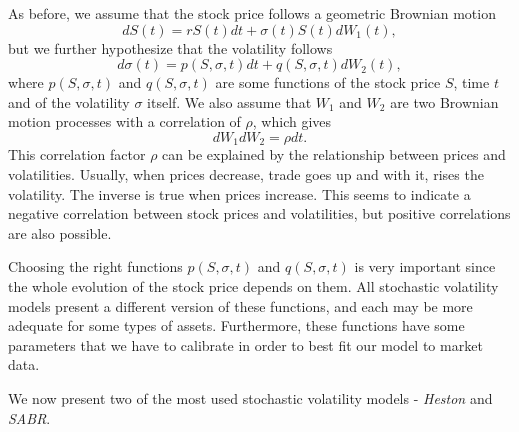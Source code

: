 As before, we assume that the stock price follows a geometric Brownian motion
\begin{equation}\label{stochvol}
dS(t)=rS(t)dt+\sigma(t)S(t)dW_1(t),
\end{equation}
\noindent but we further hypothesize that the volatility follows
\begin{equation}
d\sigma(t)=p(S,\sigma,t)dt+q(S,\sigma,t)dW_2(t),
\end{equation}
\noindent where $p(S,\sigma,t)$ and $q(S,\sigma,t)$ are some functions of the stock price $S$, time $t$ and of the volatility $\sigma$ itself. We also assume that $W_1$ and $W_2$ are two Brownian motion processes with a correlation of $\rho$, which gives
\begin{equation}
dW_1dW_2=\rho dt.
\end{equation}
\noindent This correlation factor $\rho$ can be explained by the relationship between prices and volatilities. Usually, when prices decrease, trade goes up and with it, rises the volatility. The inverse is true when prices increase. This seems to indicate a negative correlation between stock prices and volatilities, but positive correlations are also possible.

\iffalse
\hl{This correlation can be explained by the relationship between prices and volatilities.} As an example, we can consider a stock that costs \textdollar100 and changes by \textdollar0.10 daily. We can estimate, even without calculations, that it is very stable and thus has a low volatility.
On the other hand if another stock costs \textdollar1 and changes by \textdollar0.10 in a day, we can see that it is extremely volatile even though it changed by the same amount as the first. With this example, we can see that the volatility has some correlation with the stock price.
\fi

Choosing the right functions $p(S,\sigma,t)$ and $q(S,\sigma,t)$ is very important since the whole evolution of the stock price depends on them. All stochastic volatility models present a different version of these functions, and each may be more adequate for some types of assets. Furthermore, these functions have some parameters that we have to calibrate in order to best fit our model to market data.

We now present two of the most used stochastic volatility models - \emph{Heston} and \emph{SABR}.



